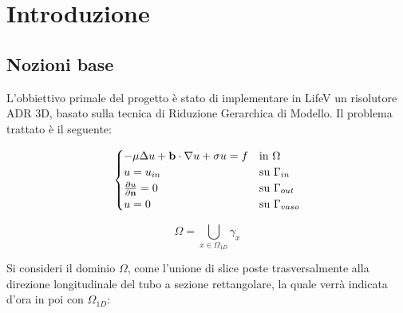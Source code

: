 \chapter{Introduzione}
\section{Nozioni base}

L'obbiettivo primale del progetto \`e stato di implementare in LifeV un risolutore ADR 3D, basato sulla tecnica di Riduzione Gerarchica di Modello.
Il problema trattato \`e il seguente:

\begin{equation}
\label{eq: problema forte}
\begin{cases}
-\mu\Delta u + \mathbf{b}\cdot \nabla u + \sigma u = f & \text{in $\Omega$}\\
u=u_{in} & \text{su $\Gamma_{in}$}\\
\frac{\partial u}{\partial \mathbf{n}}=0 & \text{su $\Gamma_{out}$ }\\
u=0 & \text{su $\Gamma _{vaso}$} \\
\end{cases}
\end{equation}


\begin{equation}
\label{eq:volume ridotto}
\Omega=\bigcup_{x\in \Omega_{1D}}\gamma_x
\end{equation}

\begin{center}
\end{center}


Si consideri il dominio $\Omega$, come l'unione di slice poste trasversalmente alla direzione longitudinale del tubo a sezione rettangolare, la quale verr\`a indicata d'ora in poi con $\Omega_{1D}$:



